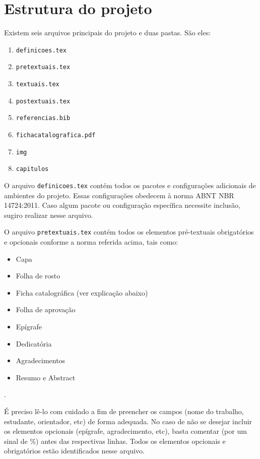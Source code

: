 \chapter{Estrutura do projeto}

Existem seis arquivos principais do projeto e duas pastas. São eles:

\begin{enumerate}
	\item \verb|definicoes.tex|
	\item \verb|pretextuais.tex|
	\item \verb|textuais.tex|
	\item \verb|postextuais.tex|
	\item \verb|referencias.bib|
	\item \verb|fichacatalografica.pdf|
	\item \verb|img|
	\item \verb|capitulos|
\end{enumerate}

O arquivo \verb|definicoes.tex| contém todos os pacotes e configurações adicionais de ambientes do projeto. Essas configurações obedecem à norma ABNT NBR 14724:2011. Caso algum pacote ou configuração específica necessite inclusão, sugiro realizar nesse arquivo.

O arquivo \verb|pretextuais.tex| contém todos os elementos pré-textuais obrigatórios e opcionais conforme a norma referida acima, tais como:

\begin{itemize}
	\item Capa
	\item Folha de rosto
	\item Ficha catalográfica (ver explicação abaixo)
	\item Folha de aprovação
	\item Epígrafe
	\item Dedicatória
	\item Agradecimentos
	\item Resumo e Abstract
\end{itemize}. 

É preciso lê-lo com cuidado a fim de preencher os campos (nome do trabalho, estudante, orientador, etc) de forma adequada. No caso de não se desejar incluir os elementos opcionais (epígrafe, agradecimento, etc), basta comentar (por um sinal de \%) antes das respectivas linhas. Todos os elementos opcionais e obrigatórios estão identificados nesse arquivo.

